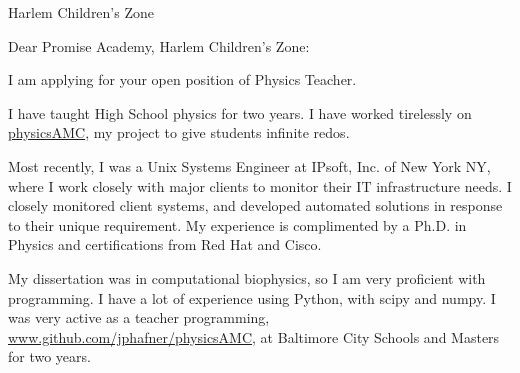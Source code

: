 \documentclass[
    jphafner,
    fontsize=11pt,
    foldmarks=false,
    pagenumber=false,
    addrfield=true,
]{scrlttr2}
\date{\today}
\begin{document}
\begin{letter}{Harlem Children's Zone}
    \opening{Dear Promise Academy, Harlem Children's Zone:}

    I am applying for your open position of Physics Teacher.


    I have taught High School physics for two years.
    I have worked tirelessly on \href{https://github.com/jphafner/physicsAMC}{physicsAMC}, my project to give students infinite redos.

    
 Most recently, I was a Unix Systems Engineer at IPsoft, Inc. of New York NY,
    where I work closely with major clients to monitor their IT infrastructure needs. 
    I closely monitored client systems, and developed automated solutions in response to their unique requirement.
    My experience is complimented by a Ph.D. in Physics and certifications from Red Hat and Cisco.

My dissertation was in computational biophysics, so I am very proficient with programming.
    I have a lot of experience using Python, with scipy and numpy.
    I was very active as a teacher programming, \url{www.github.com/jphafner/physicsAMC},
        at Baltimore City Schools and Masters for two years.



\end{letter}
\end{document}
